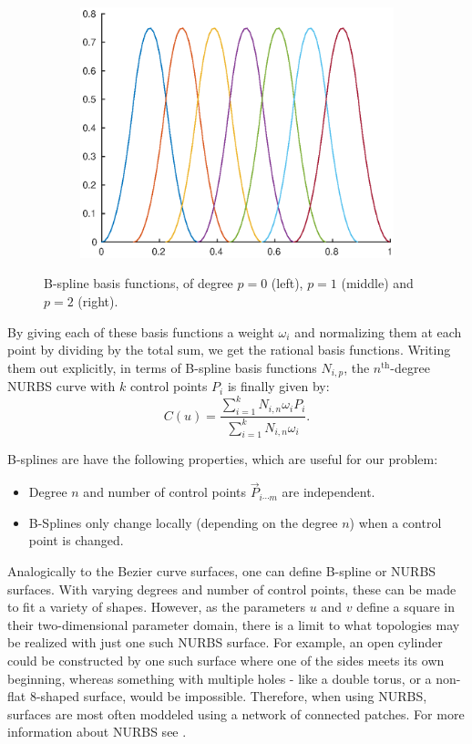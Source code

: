 \begin{figure}
\begin{subfigure}[b]{.3\linewidth}
  \includegraphics[width=\linewidth]{Pictures/basisquadratic}
  \label{fig:lognorm_quadratic}
\end{subfigure}
\caption{B-spline basis functions, of degree $p=0$ (left), $p=1$ (middle) and $p=2$ (right).}
\label{fig:bsplineBases}
\end{figure}


By giving each of these basis functions a weight $\omega_i$ and normalizing them at each point by dividing by the total sum, we get the rational basis functions. Writing them out explicitly, in terms of B-spline basis functions $N_{i,p}$, the $n^{\text{th}}$-degree NURBS curve with $k$ control points $P_i$ is finally given by:
\begin{equation}
C(u) = \frac{\sum_{i=1}^{k}N_{i,n}\omega_{i}P_{i}}{\sum_{i=1}^{k}N_{i,n}\omega_{i}}.
\end{equation}

B-splines are have the following properties, which are useful for our problem:
\begin{itemize}
\item Degree $n$ and number of control points $\vec{P}_{i\cdots m}$ are independent.
\item B-Splines only change locally (depending on the degree $n$) when a control point is changed.
\end{itemize}

Analogically to the Bezier curve surfaces, one can define B-spline or NURBS surfaces. With varying degrees and number of control points, these can be made to fit a variety of shapes. However, as the parameters $u$ and $v$ define a square in their two-dimensional parameter domain, there is a limit to what topologies may be realized with just one such NURBS surface. For example, an open cylinder could be constructed by one such surface where one of the sides meets its own beginning, whereas something with multiple holes - like a double torus, or a non-flat 8-shaped surface, would be impossible. Therefore, when using NURBS, surfaces are most often moddeled using a network of connected patches.  For more information about NURBS see \cite{farin1999nurbs}.